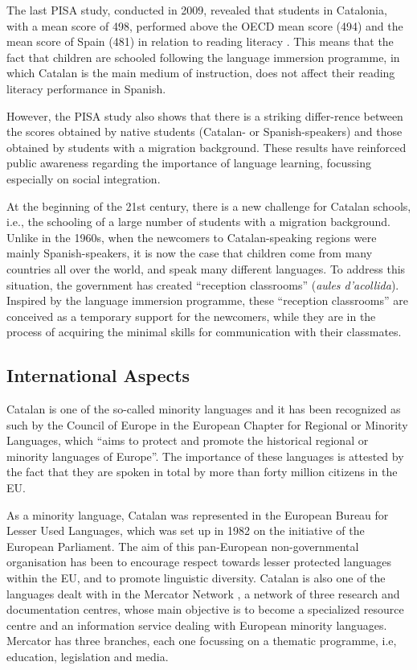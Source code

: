 \documentclass[]{../../metanetpaper}
\begin{document}
\begin{multicols}{2}
The last PISA study, conducted in 2009, revealed that students in Catalonia, with a mean score of 498, performed above the OECD mean score (494) and the mean score of Spain (481) in relation to reading literacy \cite{CAT-Nota7}. This means that the fact that children are schooled following the language immersion programme, in which Catalan is the main medium of instruction, does not affect their reading literacy performance in Spanish.

However, the PISA study also shows that there is a striking differ-rence between the scores obtained by native students (Catalan- or Spanish-speakers) and those obtained by students with a migration background. These results have reinforced public awareness regarding the importance of language learning, focussing especially on social integration.

At the beginning of the 21st century, there is a new challenge for Catalan schools, i.e., the schooling of a large number of students with a migration background. Unlike in the 1960s, when the newcomers to Catalan-speaking regions were mainly Spanish-speakers, it is now the case that children come from many countries all over the world, and speak many different languages. To address this situation, the government has created “reception classrooms” (\textit{aules d’acollida}). Inspired by the language immersion programme, these “reception classrooms” are conceived as a temporary support for the newcomers, while they are in the process of acquiring the minimal skills for communication with their classmates.

\subsection{International Aspects}

Catalan is one of the so-called minority languages and it has been recognized as such by the Council of Europe in the European Chapter for Regional or Minority Languages, which “aims to protect and promote the historical regional or minority languages of Europe”. The importance of these languages is attested by the fact that they are spoken in total by more than forty million citizens in the EU.

As a minority language, Catalan was represented in the European Bureau for Lesser Used Languages, which was set up in 1982 on the initiative of the European Parliament. The aim of this pan-European non-governmental organisation has been to encourage respect towards lesser protected languages within the EU, and to promote linguistic diversity. Catalan is also one of the languages dealt with in the Mercator Network \cite{CAT-Nota8}, a network of three research and documentation centres, whose main objective is to become a specialized resource centre and an information service dealing with European minority languages. Mercator has three branches, each one focus\-sing on a thematic programme, i.e, education, legislation and media.


\end{multicols}
\end{document}
